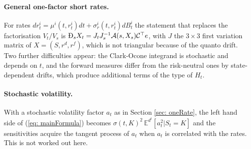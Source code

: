 \paragraph{General one-factor short rates.} For rates $dr^i_t=\mu^i(t,r^i_t)dt+\sigma^i_r(t,r^i_t)dB^i_t$ the statement that replaces the factorisation $V_t/V_s$ is $\MD_sX_t=J_tJ_s^{-1}\mathcal{A}(s,X_s)\mathcal{C}^\top e$, with $J$ the $3\times3$ first variation matrix of $X=(S,r^d,r^f)$, which is not triangular because of the quanto drift. Two further difficulties appear: the Clark-Ocone integrand is stochastic and depends on $t$, and the forward measures differ from the risk-neutral ones by state-dependent drifts, which produce additional terms of the type of $H_t$.

\paragraph{Stochastic volatility.} With a stochastic volatility factor $a_t$ as in Section \ref{sec: oneRate}, the left hand side of (\ref{eq: mainFormula}) becomes $\sigma(t,K)^2\,\mathbb{E}^{d^t}[a_t^2|S_t=K]$ and the sensitivities acquire the tangent process of $a_t$ when $a_t$ is correlated with the rates. This is not worked out here.
